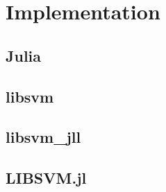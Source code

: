 \section{Implementation}

\subsection{Julia}

\textcite{arquemartinezDissenyImplementacioEstudi2021}

\subsection{libsvm}

\textcite{CC01a}

\subsection{libsvm\_jll}

\textcite{LibsvmJllJl2022}

\subsection{LIBSVM.jl}

\textcite{LIBSVMJl2023}

